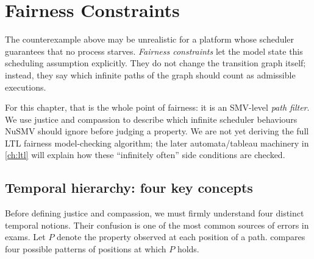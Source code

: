 \section{Fairness Constraints}
\label{sec:fairness}

The counterexample above may be unrealistic for a platform whose scheduler
guarantees that no process starves.  \emph{Fairness constraints} let the model
state this scheduling assumption explicitly.
They do not change the transition graph itself; instead, they say which
infinite paths of the graph should count as admissible executions.

For this chapter, that is the whole point of fairness: it is an
SMV-level \emph{path filter}.  We use justice and compassion to describe
which infinite scheduler behaviours NuSMV should ignore before judging a
property.  We are not yet deriving the full LTL fairness model-checking
algorithm; the later automata/tableau machinery in \cref{ch:ltl} will
explain how these ``infinitely often'' side conditions are checked.

\subsection{Temporal hierarchy: four key concepts}

Before defining justice and compassion, we must firmly understand four
distinct temporal notions.  Their confusion is one of the most common
sources of errors in exams.  Let \(P\) denote the property observed at each
position of a path.   compares four possible
patterns of positions at which \(P\) holds.

